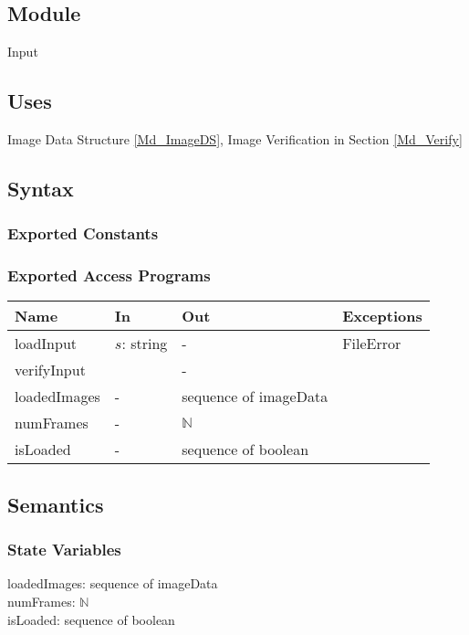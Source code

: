 \documentclass[12pt, titlepage]{article}
\begin{document}
\subsection{Module}

Input

\subsection{Uses}

Image Data Structure \ref{Md_ImageDS}, Image Verification in Section
\ref{Md_Verify}

\subsection{Syntax}

\subsubsection{Exported Constants}

\subsubsection{Exported Access Programs}

\begin{center}
\begin{tabular}{p{3cm} p{2cm} p{5cm} p{2cm}}
\hline
\textbf{Name} & \textbf{In} & \textbf{Out} & \textbf{Exceptions} \\
\hline
loadInput & $s$: string & - & FileError\\
verifyInput & & - & \\
loadedImages & - & sequence of imageData\\
numFrames & - & $\mathbb{N}$ & \\
isLoaded & - & sequence of boolean\\
\hline
\end{tabular}
\end{center}

\subsection{Semantics}

\subsubsection{State Variables}

loadedImages: sequence of imageData\\
numFrames: $\mathbb{N}$\\
isLoaded: sequence of boolean
\end{document}
